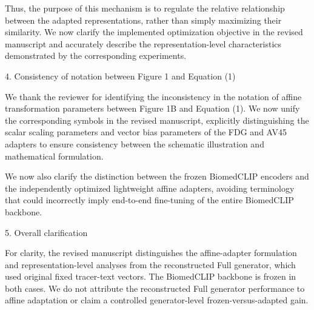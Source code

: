 {Thus, the purpose of this mechanism is to regulate the relative relationship between the adapted representations, rather than simply maximizing their similarity. We now clarify the implemented optimization objective in the revised manuscript and accurately describe the representation-level characteristics demonstrated by the corresponding experiments.

4. Consistency of notation between Figure 1 and Equation (1)

We thank the reviewer for identifying the inconsistency in the notation of affine transformation parameters between Figure 1B and Equation (1). We now unify the corresponding symbols in the revised manuscript, explicitly distinguishing the scalar scaling parameters and vector bias parameters of the FDG and AV45 adapters to ensure consistency between the schematic illustration and mathematical formulation.

We now also clarify the distinction between the frozen BiomedCLIP encoders and the independently optimized lightweight affine adapters, avoiding terminology that could incorrectly imply end-to-end fine-tuning of the entire BiomedCLIP backbone.

5. Overall clarification

For clarity, the revised manuscript distinguishes the affine-adapter formulation and representation-level analyses from the reconstructed Full generator, which used original fixed tracer-text vectors. The BiomedCLIP backbone is frozen in both cases. We do not attribute the reconstructed Full generator performance to affine adaptation or claim a controlled generator-level frozen-versus-adapted gain.}


